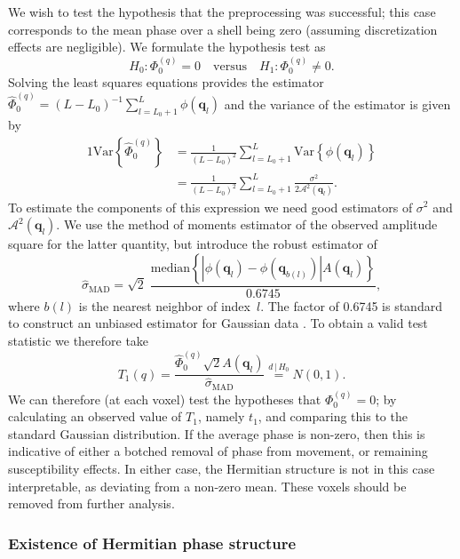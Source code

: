 \documentclass[authoryear,preprint,12pt]{elsarticle}
\newcommand{\var}{\text{Var}}
\newcommand{\q}{\mathbf{q}}
\newcommand{\cA}{\mathcal{A}}
\newcommand{\wh}[1]{\widehat{#1}}
\begin{document}
We wish to test the hypothesis that the preprocessing was successful;
this case corresponds to the mean phase over a shell being zero
(assuming discretization effects are negligible).  We formulate the
hypothesis test as
\begin{equation}
  H_0: \Phi_0^{(q)} = 0 \quad \text{versus} \quad H_1: \Phi_0^{(q)}
  \neq 0.
\end{equation}
Solving the least squares equations provides the estimator
$\wh{\Phi}_0^{(q)}=(L-L_0)^{-1}\sum_{l=L_0+1}^{L}\phi(\q_l)$ and the
variance of the estimator is given by
\begin{alignat}{1}
  \var\left\{\wh{\Phi}_0^{(q)}\right\} &= \frac{1}{(L-L_0)^2}
  \sum_{l=L_0+1}^{L} \var\left\{\phi(\q_l)\right\}\\
  &= \frac{1}{(L-L_0)^2} \sum_{l=L_0+1}^{L}
  \frac{\sigma^2}{2\cA^2(\q_l)}.
\end{alignat}
To estimate the components of this expression we need good estimators
of $\sigma^2$ and $\cA^2(\q_l)$.  We use the method of moments
estimator of the observed amplitude square for the latter quantity,
but introduce the robust estimator of
\begin{equation}
  \hat{\sigma}_{\text{MAD}} = \sqrt{2} \; \frac{{\text{median}} 
    \left\{\left|\phi(\q_l) - \phi(\q_{b(l)})\right|
    A(\q_l)\right\}}{0.6745},
\end{equation}
where $b(l)$ is the nearest neighbor of index~$l$.  The factor of
0.6745 is standard to construct an unbiased estimator for Gaussian
data \citep{Hoaglin}.  To obtain a valid test statistic we therefore
take
\begin{equation}
  T_1(q) = \frac{\wh{\Phi}_0^{(q)}\sqrt{2}A(\q_l)}
  {\hat{\sigma}_{\text{MAD}}} \overset{d\,|\,H_0}{=} N(0,1).
\end{equation}
We can therefore (at each voxel) test the hypotheses that
$\Phi_0^{(q)}=0$; by calculating an observed value of $T_1$, namely
$t_1$, and comparing this to the standard Gaussian distribution.  If
the average phase is non-zero, then this is indicative of either a
botched removal of phase from movement, or remaining susceptibility
effects.  In either case, the Hermitian structure is not in this case
interpretable, as deviating from a non-zero mean.  These voxels should
be removed from further analysis.

\subsubsection{Existence of Hermitian phase structure}
\end{document}
